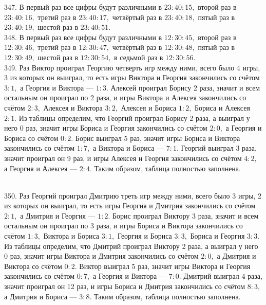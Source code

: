 \documentclass[12pt]{article}
\begin{document}
347. В первый раз все цифры будут различными в $23:40:15,$ второй раз в $23:40:16,$ третий раз в $23:40:17,$ четвёртый раз в $23:40:18,$ пятый раз в $23:40:19,$ шестой раз в $23:40:51.$\\
348. В первый раз все цифры будут различными в $12:30:45,$ второй раз в $12:30:46,$ третий раз в $12:30:47,$ четвёртый раз в $12:30:48,$ пятый раз в $12:30:49,$ шестой раз в $12:30:54,$ в седьмой раз в $12:30:56.$\\
349. Раз Виктор проиграл Георгию четверть игр между ними, всего было 4 игры, 3 из которых он выиграл, то есть игры Виктора и Георгия закончились со счётом $3:1,$ а Георгия и Виктора --- $1:3.$ Алексей проиграл Борису 2 раза, значит и всем остальным он проиграл по 2 раза, и игры Виктора и Алексея закончились со счётом $2:3,$ Алексея и Виктора $3:2,$ Алексея и Бориса $1:2,$ Бориса и Алексея $2:1.$ Из таблицы определим, что Георгий проиграл Борису 2 раза, а выиграл у него 0 раз, значит игры Бориса и Георгия закончились со счётом $2:0,$ а Георгия и Бориса со счётом $0:2.$ Борис выиграл 5 раз, значит игры Бориса и Виктора закончились со счётом $1:7,$ а Виктора и Бориса --- $7:1.$ Георгий выиграл 3 раза, значит проиграл он 9 раз, и игры Алексея и Георгия закончились со счётом $4:2,$ а Георгия и Алексея --- $2:4.$ Таким образом, таблица полностью заполнена.
\begin{figure}[ht!]
\end{figure}\\
350. Раз Георгий проиграл Дмитрию треть игр между ними, всего было 3 игры, 2 из которых он выиграл, то есть игры Георгия и Дмитрия закончились со счётом $2:1,$ а Дмитрия и Георгия --- $1:2.$ Борис проиграл Виктору 3 раза, значит и всем остальным он проиграл по 3 раза, и игры Бориса и Виктора закончились со счётом $1:3,$ Виктора и Бориса $3:1,$ Георгия и Бориса $3:3,$ Бориса и Георгия $3:3.$ Из таблицы определим, что Дмитрий проиграл Виктору 2 раза, а выиграл у него 0 раз, значит игры Виктора и Дмитрия закончились со счётом $2:0,$ а Дмитрия и Виктора со счётом $0:2.$ Виктор выиграл 5 раз, значит игры Виктора и Георгия закончились со счётом $0:7,$ а Георгия и Виктора --- $7:0.$ Дмитрий выиграл 4 раза, значит проиграл он 12 раз, и игры Бориса и Дмитрия закончились со счётом $8:3,$ а Дмитрия и Бориса --- $3:8.$ Таким образом, таблица полностью заполнена.\\
\end{document}
